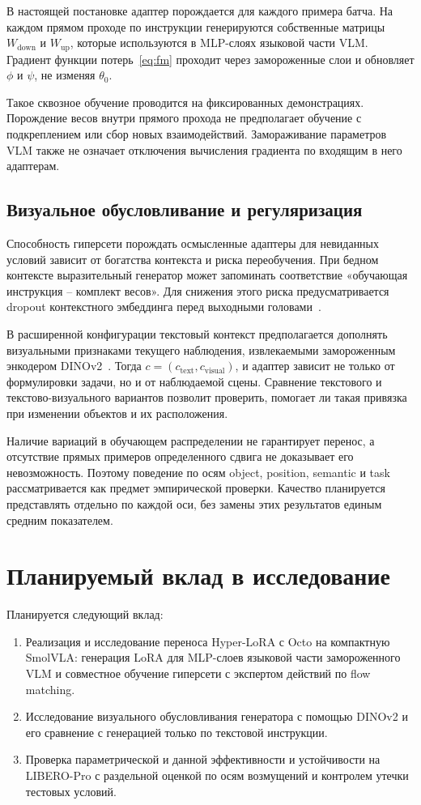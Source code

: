 \documentclass{misisarticle}
\begin{document}
В настоящей постановке адаптер порождается для каждого примера батча. На каждом прямом проходе по инструкции генерируются собственные матрицы $W_{\mathrm{down}}$ и $W_{\mathrm{up}}$, которые используются в MLP-слоях языковой части VLM. Градиент функции потерь~\eqref{eq:fm} проходит через замороженные слои и обновляет $\phi$ и $\psi$, не изменяя $\theta_0$.

Такое сквозное обучение проводится на фиксированных демонстрациях. Порождение весов внутри прямого прохода не предполагает обучение с подкреплением или сбор новых взаимодействий. Замораживание параметров VLM также не означает отключения вычисления градиента по входящим в него адаптерам.

\subsection{Визуальное обусловливание и регуляризация}

Способность гиперсети порождать осмысленные адаптеры для невиданных условий зависит от богатства контекста и риска переобучения. При бедном контексте выразительный генератор может запоминать соответствие «обучающая инструкция -- комплект весов». Для снижения этого риска предусматривается dropout контекстного эмбеддинга перед выходными головами~\cite{hyperlora}.

В расширенной конфигурации текстовый контекст предполагается дополнять визуальными признаками текущего наблюдения, извлекаемыми замороженным энкодером DINOv2~\cite{dinov2}. Тогда $c=(c_{\mathrm{text}},c_{\mathrm{visual}})$, и адаптер зависит не только от формулировки задачи, но и от наблюдаемой сцены. Сравнение текстового и текстово-визуального вариантов позволит проверить, помогает ли такая привязка при изменении объектов и их расположения.

Наличие вариаций в обучающем распределении не гарантирует перенос, а отсутствие прямых примеров определенного сдвига не доказывает его невозможность. Поэтому поведение по осям object, position, semantic и task рассматривается как предмет эмпирической проверки. Качество планируется представлять отдельно по каждой оси, без замены этих результатов единым средним показателем.

\section{Планируемый вклад в исследование}

Планируется следующий вклад:
\begin{enumerate}[leftmargin=0.65cm,itemsep=1pt,topsep=2pt]
  \item Реализация и исследование переноса Hyper-LoRA с Octo на компактную SmolVLA: генерация LoRA для MLP-слоев языковой части замороженного VLM и совместное обучение гиперсети с экспертом действий по flow matching.
  \item Исследование визуального обусловливания генератора с помощью DINOv2 и его сравнение с генерацией только по текстовой инструкции.
  \item Проверка параметрической и данной эффективности и устойчивости на LIBERO-Pro с раздельной оценкой по осям возмущений и контролем утечки тестовых условий.
\end{enumerate}
\end{document}
